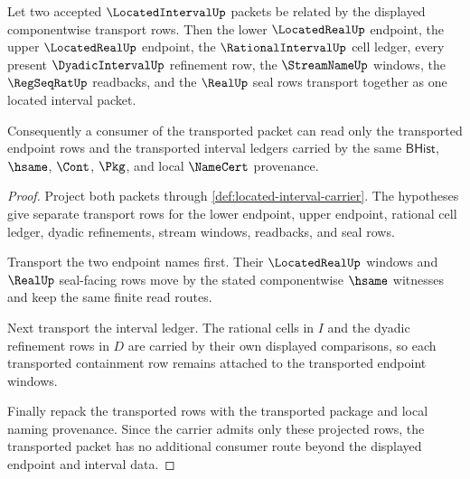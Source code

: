 \begin{theorem}
\label{thm:located-interval-endpoint-transport}
Let two accepted $\LocatedIntervalUp$ packets be related by the displayed componentwise transport rows. Then the lower $\LocatedRealUp$ endpoint, the upper $\LocatedRealUp$ endpoint, the $\RationalIntervalUp$ cell ledger, every present $\DyadicIntervalUp$ refinement row, the $\StreamNameUp$ windows, the $\RegSeqRatUp$ readbacks, and the $\RealUp$ seal rows transport together as one located interval packet.

Consequently a consumer of the transported packet can read only the transported endpoint rows and the transported interval ledgers carried by the same $\mathsf{BHist}$, $\hsame$, $\Cont$, $\Pkg$, and local $\NameCert$ provenance.
\end{theorem}
\begin{proof}
Project both packets through \autoref{def:located-interval-carrier}. The hypotheses give separate transport rows for the lower endpoint, upper endpoint, rational cell ledger, dyadic refinements, stream windows, readbacks, and seal rows.

Transport the two endpoint names first. Their $\LocatedRealUp$ windows and $\RealUp$ seal-facing rows move by the stated componentwise $\hsame$ witnesses and keep the same finite read routes.

Next transport the interval ledger. The rational cells in $I$ and the dyadic refinement rows in $D$ are carried by their own displayed comparisons, so each transported containment row remains attached to the transported endpoint windows.

Finally repack the transported rows with the transported package and local naming provenance. Since the carrier admits only these projected rows, the transported packet has no additional consumer route beyond the displayed endpoint and interval data.
\end{proof}

